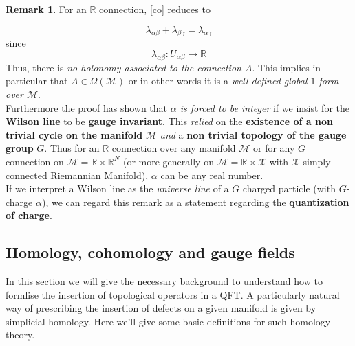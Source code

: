 \documentclass[11pt]{article}
\theoremstyle{definition}
\newtheorem{rem}{Remark}
\numberwithin{equation}{section}
\begin{document}
\begin{rem}
    For an $\mathbb{R}$ connection, \eqref{co} reduces to

    \begin{equation}
    \lambda_{\alpha \beta} + \lambda_{\beta \gamma} = \lambda_{\alpha \gamma} 
\end{equation}
since
\begin{equation}
    \lambda_{\alpha \beta}: U_{\alpha \beta}  \to \mathbb{R}
\end{equation}
Thus, there is \textit{no holonomy associated to the connection $A$}. This implies in particular that $A \in \Omega(\mathcal{M})$ or in other words it is a \textit{well defined global $1$-form over $\mathcal{M}$}. \\

Furthermore the proof has shown that \textit{$\alpha$ is forced to be integer} if we insist for the \textbf{Wilson line} to be \textbf{gauge invariant}. This \textit{relied} on the \textbf{existence of a non trivial cycle on the manifold} $\mathcal{M}$ \textit{and} a \textbf{non trivial topology of the gauge group} $G$. Thus for an $\mathbb{R}$ connection over any manifold $\mathcal{M}$ or for any $G$ connection on $\mathcal{M} = \mathbb{R} \times \mathbb{R}^N$ (or more generally on $\mathcal{M} = \mathbb{R} \times \mathcal{X}$ with $\mathcal{X}$ simply connected Riemannian Manifold), $\alpha$ can be any real number. \\

If we interpret a Wilson line as the \textit{universe line} of a $G$ charged particle (with $G$-charge $\alpha$), we can regard this remark as a statement regarding the \textbf{quantization of charge}.    
\end{rem}

\subsection{Homology, cohomology and gauge fields}
In this section we will give the necessary background to understand how to formlise the insertion of topological operators in a QFT. A particularly natural way of prescribing the insertion of defects on a given manifold is given by simplicial homology. Here we'll give some basic definitions for such homology theory.\\
\end{document}
